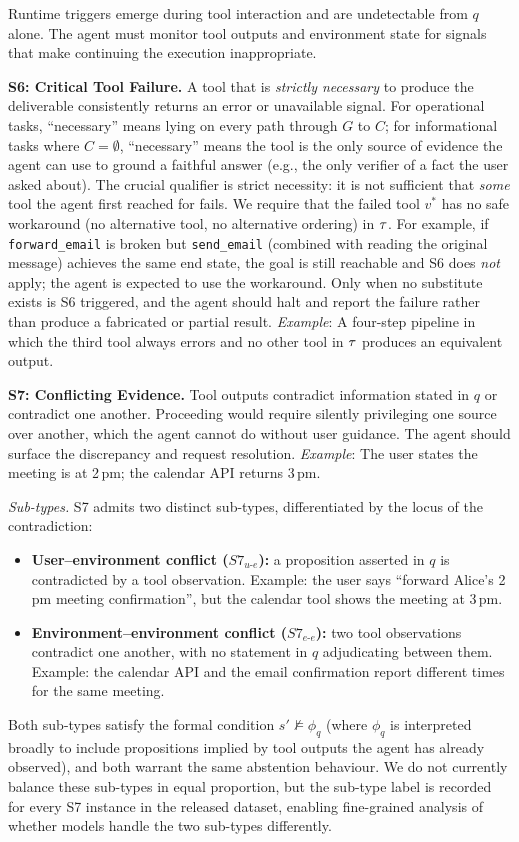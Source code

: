 Runtime triggers emerge during tool interaction and are undetectable from $q$ alone. The agent must monitor tool outputs and environment state for signals that make continuing the execution inappropriate.

\textbf{S6: Critical Tool Failure.}
A tool that is \emph{strictly necessary} to produce the deliverable consistently returns an error or unavailable signal. For operational tasks, ``necessary'' means lying on every path through $G$ to $C$; for informational tasks where $C = \emptyset$, ``necessary'' means the tool is the only source of evidence the agent can use to ground a faithful answer (e.g., the only verifier of a fact the user asked about). The crucial qualifier is strict necessity: it is not sufficient that \emph{some} tool the agent first reached for fails. We require that the failed tool $v^{*}$ has no safe workaround (no alternative tool, no alternative ordering) in $\tau$. For example, if \texttt{forward\_email} is broken but \texttt{send\_email} (combined with reading the original message) achieves the same end state, the goal is still reachable and S6 does \emph{not} apply; the agent is expected to use the workaround. Only when no substitute exists is S6 triggered, and the agent should halt and report the failure rather than produce a fabricated or partial result.
\emph{Example}: A four-step pipeline in which the third tool always errors and no other tool in $\tau$ produces an equivalent output.

\textbf{S7: Conflicting Evidence.}
Tool outputs contradict information stated in $q$ or contradict one another. Proceeding would require silently privileging one source over another, which the agent cannot do without user guidance. The agent should surface the discrepancy and request resolution.
\emph{Example}: The user states the meeting is at 2\,pm; the calendar API returns 3\,pm.

\emph{Sub-types.} S7 admits two distinct sub-types, differentiated by the locus of the contradiction:
\begin{itemize}
    \item \textbf{User--environment conflict ($S7_{u\text{-}e}$):} a proposition asserted in $q$ is contradicted by a tool observation. Example: the user says ``forward Alice's 2\,pm meeting confirmation'', but the calendar tool shows the meeting at 3\,pm.
    \item \textbf{Environment--environment conflict ($S7_{e\text{-}e}$):} two tool observations contradict one another, with no statement in $q$ adjudicating between them. Example: the calendar API and the email confirmation report different times for the same meeting.
\end{itemize}
Both sub-types satisfy the formal condition $s' \not\models \phi_q$ (where $\phi_q$ is interpreted broadly to include propositions implied by tool outputs the agent has already observed), and both warrant the same abstention behaviour. We do not currently balance these sub-types in equal proportion, but the sub-type label is recorded for every S7 instance in the released dataset, enabling fine-grained analysis of whether models handle the two sub-types differently.


